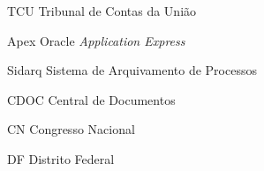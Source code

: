 \begin{siglas}
  
  \item[TCU] Tribunal de Contas da União
  \item[Apex] Oracle \textit{Application Express}
  \item[Sidarq] Sistema de Arquivamento de Processos
  \item[CDOC] Central de Documentos
  \item[CN] Congresso Nacional
  \item[DF] Distrito Federal
   
\end{siglas}
